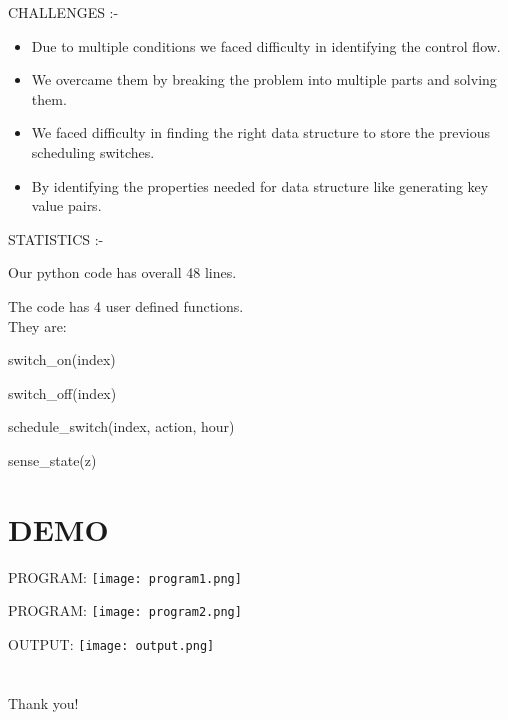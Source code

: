 \documentclass[15pt]{beamer}
\begin{document}
 
\begin{frame}{CHALLENGES :-}
\begin{itemize}

\item {Due to multiple conditions we faced difficulty in identifying the control flow.}
\item {We overcame them by breaking the problem into multiple parts and solving them.}
\item {We faced difficulty in finding the right data structure to store the previous scheduling switches.}
\item {By identifying the properties needed for data structure like generating key value pairs.}
\end{itemize}

\end{frame}
\begin{frame}{STATISTICS :-}

\begin{itemize}

\item{ Our python code has overall 48 lines.
\item The code has 4 user defined functions.\\
They are:}

\item{switch\_on(index)}
\item{switch\_off(index)}
\item{schedule\_switch(index, action, hour)}
\item{sense\_state(z)}
\end{itemize}

\end{frame}

\section{DEMO}
\begin{frame}{PROGRAM:}
\texttt{[image: program1.png]}

\end{frame}

\begin{frame}{PROGRAM:}
\texttt{[image: program2.png]}

\end{frame}

\begin{frame}{OUTPUT:}
\texttt{[image: output.png]}

\end{frame}

\section*{}
\begin{frame}
\textcolor{myNewColorA}{\Huge{\centerline{Thank you!}}}
\end{frame}
\end{document}

